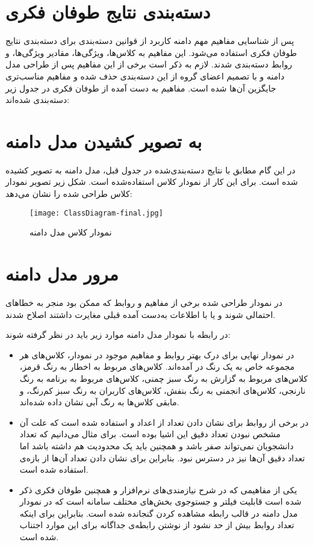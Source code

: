 \documentclass{report}
\begin{document}
\section{دسته‌بندی نتایج طوفان فکری}
پس از شناسایی مفاهیم مهم دامنه کاربرد از قوانین دسته‌بندی برای دسته‌بندی نتایج طوفان فکری استفاده می‌شود. این مفاهیم به کلاس‌ها، ویژگی‌ها، مقادیر ویژگی‌ها، و روابط دسته‌بندی شدند. لازم به ذکر است برخی از این مفاهیم پس از طراحی مدل دامنه و با تصمیم اعضای گروه از این دسته‌بندی حذف شده و مفاهیم مناسب‌تری جایگزین آن‌ها شده است. مفاهیم به‌ دست آمده از طوفان فکری در جدول زیر دسته‌بندی شده‌اند:



\clearpage
\section{به ‌تصویر کشیدن مدل دامنه}  

در این گام مطابق با نتایج دسته‌بندی‌شده در جدول قبل، مدل دامنه به تصویر کشیده شده است. برای این کار از نمودار کلاس استفاده‌شده است.
شکل زیر تصویر نمودار کلاس طراحی‌ شده را نشان می‌دهد:

\begin{sidewaysfigure}[h!]
  \texttt{[image: ClassDiagram-final.jpg]}
  \caption{نمودار کلاس مدل دامنه}
  \label{fig:1}
\end{sidewaysfigure}

\clearpage



\section{مرور مدل دامنه}
در نمودار طراحی‌ شده برخی از مفاهیم و روابط که ممکن بود منجر به خطاهای احتمالی شوند و یا با اطلاعات به‌دست آمده قبلی مغایرت داشتند اصلاح شدند.


در رابطه با نمودار مدل دامنه موارد زیر باید در نظر گرفته شوند:
\begin{itemize}
\item
در نمودار نهایی برای درک بهتر روابط و مفاهیم موجود در نمودار، کلاس‌های هر مجموعه خاص به یک رنگ در آمده‌اند. کلاس‌های مربوط به اخطار به رنگ قرمز، کلاس‌های مربوط به گزارش به رنگ سبز چمنی، کلاس‌های مربوط به برنامه به رنگ نارنجی، کلاس‌های انجمنی به رنگ بنفش، کلاس‌های کاربران به رنگ سبز کم‌رنگ، و مابقی کلاس‌ها به رنگ آبی نشان داده‌ شده‌اند.

\item
در برخی از روابط برای نشان دادن تعداد از اعداد 
 و 
  استفاده شده است که علت آن مشخص نبودن تعداد دقیق این اشیا بوده است. برای مثال می‌دانیم که تعداد دانشجویان نمی‌تواند صفر باشد و همچنین باید یک محدودیت هم داشته باشد اما تعداد دقیق آن‌ها نیز در دسترس نبود. بنابراین برای نشان دادن تعداد آن‌ها از بازه‌ی 
   استفاده شده است.

\item
یکی از مفاهیمی که در شرح نیازمندی‌های نرم‌افزار و همچنین طوفان فکری ذکر شده است قابلیت فیلتر و جستوجوی بخش‌های مختلف سامانه است که در نمودار مدل دامنه در قالب رابطه مشاهده کردن گنجانده‌ شده است. بنابراین برای اینکه تعداد روابط بیش‌ از حد نشود از نوشتن رابطه‌ی جداگانه برای این موارد اجتناب شده است.
\end{itemize}
\end{document}
